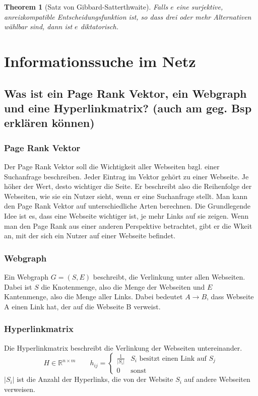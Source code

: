 \documentclass[]{article}
\newtheorem{thm}{Theorem}
\begin{document}
\begin{thm}[Satz von Gibbard-Satterthwaite]
	Falls $e$ eine surjektive, anreizkompatible Entscheidungsfunktion ist, so dass drei oder mehr Alternativen wählbar sind, dann ist $e$ diktatorisch.
\end{thm}

\section{Informationssuche im Netz}

\subsection*{Was ist ein Page Rank Vektor, ein Webgraph und eine Hyperlinkmatrix? (auch am geg. Bsp erklären können)}
\subsubsection*{Page Rank Vektor}
Der Page Rank Vektor soll die Wichtigkeit aller Webseiten bzgl. einer Suchanfrage beschreiben. Jeder Eintrag im Vektor gehört zu einer Webseite. Je höher der Wert, desto wichtiger die Seite. Er beschreibt also die Reihenfolge der Webseiten, wie sie ein Nutzer sieht, wenn er eine Suchanfrage stellt. 
Man kann den Page Rank Vektor auf unterschiedliche Arten berechnen.
Die Grundlegende Idee ist es, dass eine Webseite wichtiger ist, je mehr Links auf sie zeigen.  
Wenn man den Page Rank aus einer anderen Perspektive betrachtet, gibt er die Wkeit an, mit der sich ein Nutzer auf einer Webseite befindet. 

\subsubsection*{Webgraph}
Ein Webgraph $G=(S,E)$ beschreibt, die Verlinkung unter allen Webseiten. Dabei ist $S$ die Knotenmenge, also die Menge der Webseiten und $E$ Kantenmenge, also die Menge aller Links. Dabei bedeutet $A \rightarrow B$, dass Webseite A einen Link hat, der auf die Webseite B verweist. 

\subsubsection*{Hyperlinkmatrix}
Die Hyperlinkmatrix beschreibt die Verlinkung der Webseiten untereinander. 
\begin{equation*}
H \in \mathbb{R}^{n \times m} \qquad h_{ij} = 
\begin{cases}
\frac{1}{|S_i|} & S_i \text{ besitzt einen Link auf }S_j \\
0 & \text{sonst}
\end{cases}
\end{equation*}
 $|S_i|$ ist die Anzahl der Hyperlinks, die von der Website $S_i$ auf andere Webseiten verweisen.
 
\end{document}
